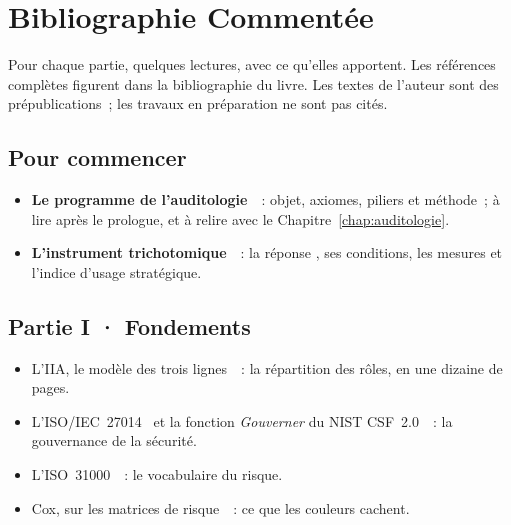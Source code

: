 
\chapter{Bibliographie Commentée}
\label{ann:bibliographie}

Pour chaque partie, quelques lectures, avec ce qu'elles apportent. Les
références complètes figurent dans la bibliographie du livre. Les textes de
l'auteur sont des prépublications~; les travaux en préparation ne sont pas
cités.

\section*{Pour commencer}

\begin{itemize}
    \item \textbf{Le programme de l'auditologie}~\cite{minka2026auditologie}~:
          objet, axiomes, piliers et méthode~; à lire après le prologue, et à
          relire avec le Chapitre~\ref{chap:auditologie}.
    \item \textbf{L'instrument trichotomique}~\cite{minka2026nek}~: la
          réponse \NEK{}, ses conditions, les mesures et l'indice d'usage
          stratégique.
\end{itemize}

\section*{Partie I · Fondements}

\begin{itemize}
    \item L'IIA, le modèle des trois lignes~\cite{iia2020troislignes}~: la
          répartition des rôles, en une dizaine de pages.
    \item L'ISO/IEC~27014~\cite{iso27014_2020} et la fonction \emph{Gouverner}
          du NIST CSF~2.0~\cite{nist2024csf}~: la gouvernance de la sécurité.
    \item L'ISO~31000~\cite{iso31000_2018}~: le vocabulaire du risque.
    \item Cox, sur les matrices de risque~\cite{cox2008matrices}~: ce que
          les couleurs cachent.
\end{itemize}

